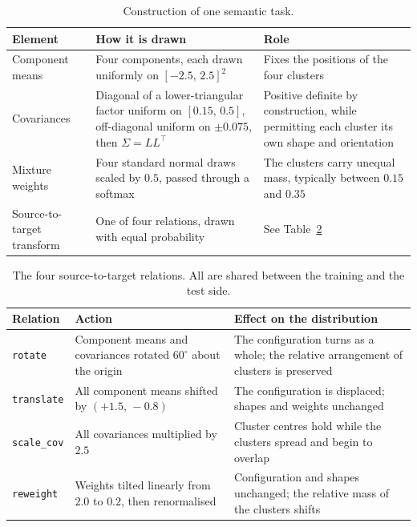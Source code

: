 \documentclass[11pt]{article}
\begin{document}
\begin{table}[htbp]
\centering\small
\begin{tabular}{@{}p{3.0cm}p{5.6cm}p{4.6cm}@{}}
\toprule
\textbf{Element} & \textbf{How it is drawn} & \textbf{Role} \\
\midrule
Component means & Four components, each drawn uniformly on $[-2.5,\,2.5]^2$
  & Fixes the positions of the four clusters \\[2pt]
Covariances & Diagonal of a lower-triangular factor uniform on $[0.15,\,0.5]$, off-diagonal uniform
  on $\pm 0.075$, then $\Sigma=LL^{\!\top}$
  & Positive definite by construction, while permitting each cluster its own shape and orientation \\[2pt]
Mixture weights & Four standard normal draws scaled by $0.5$, passed through a softmax
  & The clusters carry unequal mass, typically between $0.15$ and $0.35$ \\[2pt]
Source-to-target transform & One of four relations, drawn with equal probability
  & See Table~\ref{tab:relations} \\
\bottomrule
\end{tabular}
\caption{Construction of one semantic task.}
\label{tab:gmmconstruct}
\end{table}

\begin{table}[htbp]
\centering\small
\begin{tabular}{@{}p{2.4cm}p{5.6cm}p{5.4cm}@{}}
\toprule
\textbf{Relation} & \textbf{Action} & \textbf{Effect on the distribution} \\
\midrule
\texttt{rotate}    & Component means and covariances rotated $60^\circ$ about the origin
                   & The configuration turns as a whole; the relative arrangement of clusters is preserved \\[2pt]
\texttt{translate} & All component means shifted by $(+1.5,\,-0.8)$
                   & The configuration is displaced; shapes and weights unchanged \\[2pt]
\texttt{scale\_cov}& All covariances multiplied by $2.5$
                   & Cluster centres hold while the clusters spread and begin to overlap \\[2pt]
\texttt{reweight}  & Weights tilted linearly from $2.0$ to $0.2$, then renormalised
                   & Configuration and shapes unchanged; the relative mass of the clusters shifts \\
\bottomrule
\end{tabular}
\caption{The four source-to-target relations. All are shared between the training and the test side.}
\label{tab:relations}
\end{table}
\end{document}
